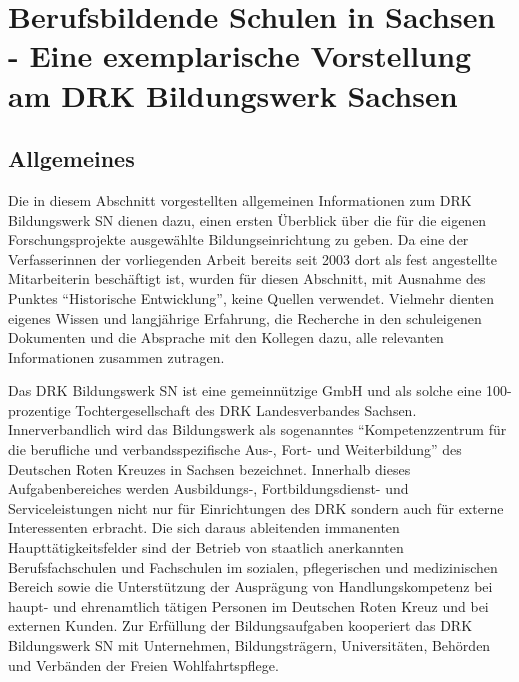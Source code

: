\section[Vorstellung des DRK Bildungswerk Sachsen]{Berufsbildende Schulen in Sachsen - Eine exemplarische Vorstellung am DRK Bildungswerk Sachsen}
\label{sec:BerufsbildendeSchulenInSachsenEineExemplarischeVorstellungAmDRKBildungswerkSachsen}

\subsection{Allgemeines}
\label{sec:Allgemeines}

Die in diesem Abschnitt vorgestellten allgemeinen Informationen zum DRK Bildungswerk SN dienen dazu, einen ersten Überblick über die für die eigenen Forschungsprojekte ausgewählte Bildungseinrichtung zu geben. Da eine der Verfasserinnen der vorliegenden Arbeit bereits seit 2003 dort als fest angestellte Mitarbeiterin beschäftigt ist, wurden für diesen Abschnitt, mit Ausnahme des Punktes "`Historische Entwicklung"', keine Quellen verwendet. Vielmehr dienten eigenes Wissen und langjährige Erfahrung, die Recherche in den schuleigenen Dokumenten und die Absprache mit den Kollegen dazu, alle relevanten Informationen zusammen zutragen.

Das DRK Bildungswerk SN ist eine gemeinnützige GmbH und als solche eine 100-prozentige Tochtergesellschaft des DRK Landesverbandes Sachsen. Innerverbandlich wird das Bildungswerk als sogenanntes "`Kompetenzzentrum für die berufliche und verbands\-spe\-zifische Aus-, Fort- und Weiterbildung"' des Deutschen Roten Kreuzes in Sachsen bezeichnet. Innerhalb dieses Aufgabenbereiches werden Ausbildungs-, Fortbildungsdienst- und Serviceleistungen nicht nur für Einrichtungen des DRK sondern auch für externe Interessenten erbracht. Die sich daraus ableitenden immanenten Haupttätigkeitsfelder sind der Betrieb von staatlich anerkannten Berufsfachschulen und Fachschulen im sozialen, pflegerischen und medizinischen Bereich sowie die Unterstützung der Ausprägung von Handlungskompetenz bei haupt- und ehrenamtlich tätigen Personen im Deutschen Roten Kreuz und bei externen Kunden. Zur Erfüllung der Bildungsaufgaben kooperiert das DRK Bildungswerk SN mit  Unternehmen, Bildungsträgern, Universitäten, Behörden und Verbänden der Freien Wohlfahrtspflege.

